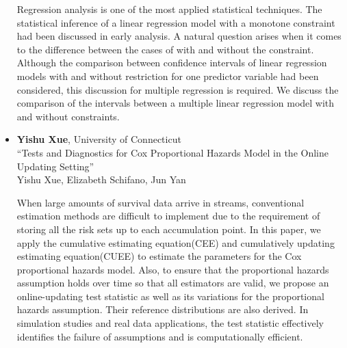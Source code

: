 \begin{itemize}
Regression analysis is one of the most applied statistical techniques. The statistical inference of a linear regression model with a monotone constraint had been discussed in early analysis. A natural question arises when it comes to the difference between the cases of with and without the constraint. Although the comparison between confidence intervals of linear regression models with and without restriction for one predictor variable had been considered, this discussion for multiple regression is required.
We discuss the comparison of the intervals between a multiple linear regression model with and without constraints.

\item \textbf{Yishu Xue}, University of Connecticut \\
``Tests and Diagnostics for Cox Proportional Hazards Model in the Online Updating Setting'' \\
Yishu Xue, Elizabeth Schifano, Jun Yan


When large amounts of survival data arrive in streams, conventional estimation
methods are difficult to implement due to the requirement of storing
all the risk sets up to each accumulation point. In this paper, we apply
the cumulative estimating equation(CEE) and cumulatively updating estimating
equation(CUEE) to estimate the parameters for the Cox proportional hazards
model. Also, to ensure that the proportional hazards assumption holds over time
so that all estimators are valid,  we propose an online-updating test statistic
 as well as its variations for the proportional hazards assumption. Their
 reference distributions are also derived. In simulation studies and real
 data applications, the test statistic effectively identifies the failure of
 assumptions and is computationally
 efficient.

\end{itemize}

